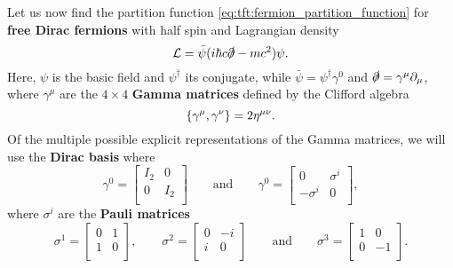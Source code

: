 Let us now find the partition function \eqref{eq:tft:fermion_partition_function} for \textbf{free Dirac fermions} with half spin and Lagrangian density
\begin{equation}
	\mathcal{L} = \bar\psi (i \hbar c \slashed\partial - m c^2) \psi .
\label{eq:tft:dirac_lagrangian}
\end{equation}
Here, $\psi$ is the basic field and $\psi^\dagger$ its conjugate, while $\bar\psi = \psi^\dagger \gamma^0$ and $\slashed\partial = \gamma^\mu \partial_\mu$, where $\gamma^\mu$ are the $4 \times 4$ \textbf{Gamma matrices} defined by the Clifford algebra
\begin{equation}
	\{ \gamma^\mu , \gamma^\nu \} = 2 \eta^{\mu \nu} .
\end{equation}
Of the multiple possible explicit representations of the Gamma matrices, we will use the \textbf{Dirac basis} where
\begin{equation}
	\gamma^0 = \begin{bmatrix} I_2 & 0 \\ 0 & I_2 \\ \end{bmatrix}
	\qquad \text{and} \qquad
	\gamma^0 = \begin{bmatrix} 0 & \sigma^i \\ -\sigma^i & 0 \\ \end{bmatrix} ,
\label{eq:tft:gamma_dirac_basis}
\end{equation}
where $\sigma^i$ are the \textbf{Pauli matrices}
\begin{equation}
	\sigma^1 = \begin{bmatrix} 0 & 1 \\ 1 & 0 \\ \end{bmatrix} ,
	\qquad
	\sigma^2 = \begin{bmatrix} 0 & -i \\ i & 0 \\ \end{bmatrix}
	\qquad \text{and} \qquad
	\sigma^3 = \begin{bmatrix} 1 & 0 \\ 0 & -1 \\ \end{bmatrix} .
\end{equation}


